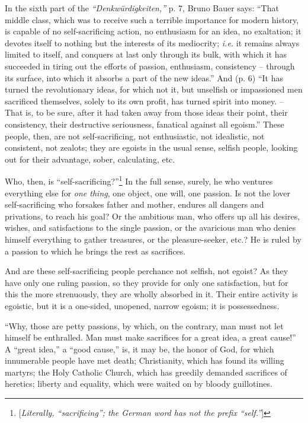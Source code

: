 In the sixth part of the \textit{``Denkw\"urdigkeiten,''} p. 7, Bruno Bauer 
says: ``That middle class, which was to receive such a terrible importance 
for modern history, is capable of no self-sacrificing action, no enthusiasm 
for an idea, no exaltation; it devotes itself to nothing but the interests of 
its mediocrity; \textit{i.e.} it remains always limited to itself, and 
conquers at last only through its bulk, with which it has succeeded in tiring 
out the efforts of passion, enthusiasm, consistency -- through its surface, 
into which it absorbs a part of the new ideas.'' And (p. 6) ``It has turned 
the revolutionary ideas, for which not it, but unselfish or impassioned men 
sacrificed themselves, solely to its own profit, has turned spirit into money. 
-- That is, to be sure, after it had taken away from those ideas their point, 
their consistency, their destructive seriousness, fanatical against all 
egoism.'' These people, then, are not self-sacrificing, not enthusiastic, not 
idealistic, not consistent, not zealots; they are egoists in the usual sense, 
selfish people, looking out for their advantage, sober, calculating, etc.

Who, then, is ``self-sacrificing?''\footnote{[\textit{Literally, 
``sacrificing''; the German word has not the prefix ``self.''}]} In the 
full sense, surely, he who ventures everything else for \textit{one thing}, 
one object, one will, one passion. Is not the lover self-sacrificing who 
forsakes father and mother, endures all dangers and privations, to reach his 
goal? Or the ambitious man, who offers up all his desires, wishes, and 
satisfactions to the single passion, or the avaricious man who denies himself 
everything to gather treasures, or the pleasure-seeker, etc.? He is ruled by a 
passion to which he brings the rest as sacrifices.

And are these self-sacrificing people perchance not selfish, not egoist? As 
they have only one ruling passion, so they provide for only one satisfaction, 
but for this the more strenuously, they are wholly absorbed in it. Their 
entire activity is egoistic, but it is a one-sided, unopened, narrow egoism; 
it is possessedness.

``Why, those are petty passions, by which, on the contrary, man must not let 
himself be enthralled. Man must make sacrifices for a great idea, a great 
cause!'' A ``great idea,'' a ``good cause,'' is, it may be, the honor of 
God, for which innumerable people have met death; Christianity, which has 
found its willing martyrs; the Holy Catholic Church, which has greedily 
demanded sacrifices of heretics; liberty and equality, which were waited on by 
bloody guillotines.

